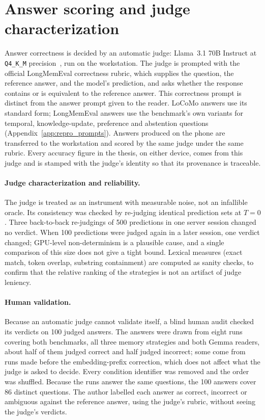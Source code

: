 \section{Answer scoring and judge characterization}
\label{sec:judge}

Answer correctness is decided by an automatic judge: Llama~3.1 70B Instruct at \texttt{Q4\_K\_M}
precision~\citep{llama31}, run on the workstation. The judge is prompted with the official
LongMemEval correctness rubric, which supplies the question, the reference answer, and the model's
prediction, and asks whether the response contains or is equivalent to the reference answer. This
correctness prompt is distinct from the answer prompt given to the reader. LoCoMo answers use its
standard form; LongMemEval answers use the benchmark's own variants for temporal, knowledge-update,
preference and abstention questions (Appendix~\ref{app:repro_prompts}). Answers produced on the phone are
transferred to the workstation and scored by the same judge under the same rubric. Every accuracy
figure in the thesis, on either device, comes from this judge and is stamped with the judge's
identity so that its provenance is traceable.

\paragraph{Judge characterization and reliability.} The judge is treated as an instrument with
measurable noise, not an infallible oracle. Its consistency was checked by re-judging identical
prediction sets at $T=0$. Three back-to-back re-judgings of 500 predictions in one server session
changed no verdict. When 100 predictions were judged again in a later session, one verdict changed;
GPU-level non-determinism is a plausible cause, and a single comparison of this size does not give a
tight bound. Lexical measures (exact match, token overlap, substring containment) are computed
as sanity checks, to confirm that the relative ranking of the strategies is not an artifact of judge
leniency.

\paragraph{Human validation.} Because an automatic judge cannot validate itself, a blind human audit
checked its verdicts on 100 judged answers. The answers were drawn from eight runs covering both
benchmarks, all three memory strategies and both Gemma readers, about half of them judged correct and
half judged incorrect; some come from runs made before the embedding-prefix correction, which does not
affect what the judge is asked to decide. Every condition identifier was removed and the order was
shuffled. Because the runs answer the same questions, the 100 answers cover 86 distinct questions.
The author labelled each answer as correct, incorrect or ambiguous against the reference answer, using
the judge's rubric, without seeing the judge's verdicts.

